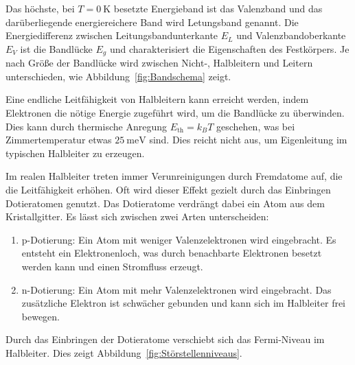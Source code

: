 \documentclass[parskip=half, a4paper,twoside,final]{article}
\begin{document}
Das höchste, bei $T=\SI{0}{\kelvin}$ besetzte Energieband ist das Valenzband und das darüberliegende energiereichere Band wird Letungsband genannt. Die Energiedifferenz zwischen Leitungsbandunterkante $E_L$ und Valenzbandoberkante $E_V$ ist die Bandlücke $E_g$ und charakterisiert die Eigenschaften des Festkörpers. Je nach Größe der Bandlücke wird zwischen Nicht-, Halbleitern und Leitern unterschieden, wie Abbildung~\ref{fig:Bandschema} zeigt.



Eine endliche Leitfähigkeit von Halbleitern kann erreicht werden, indem Elektronen die nötige Energie zugeführt wird, um die Bandlücke zu überwinden. Dies kann durch thermische Anregung $E_\text{th} = k_B T$ geschehen, was bei Zimmertemperatur etwas $\SI{25}{\milli\electronvolt}$ sind. Dies reicht nicht aus, um Eigenleitung im typischen Halbleiter zu erzeugen.

Im realen Halbleiter treten immer Verunreinigungen durch Fremdatome auf, die die Leitfähigkeit erhöhen. Oft wird dieser Effekt gezielt durch das Einbringen Dotieratomen genutzt. Das Dotieratome verdrängt dabei ein Atom aus dem Kristallgitter. Es lässt sich zwischen zwei Arten unterscheiden:
\begin{enumerate}
  \item p-Dotierung: Ein Atom mit weniger Valenzelektronen wird eingebracht. Es entsteht ein Elektronenloch, was durch benachbarte Elektronen besetzt werden kann und einen Stromfluss erzeugt.
  \item n-Dotierung: Ein Atom mit mehr Valenzelektronen wird eingebracht. Das zusätzliche Elektron ist schwächer gebunden und kann sich im Halbleiter frei bewegen.
\end{enumerate}

Durch das Einbringen der Dotieratome verschiebt sich das Fermi-Niveau im Halbleiter. Dies zeigt Abbildung~\ref{fig:Störstellenniveaus}.


\end{document}

